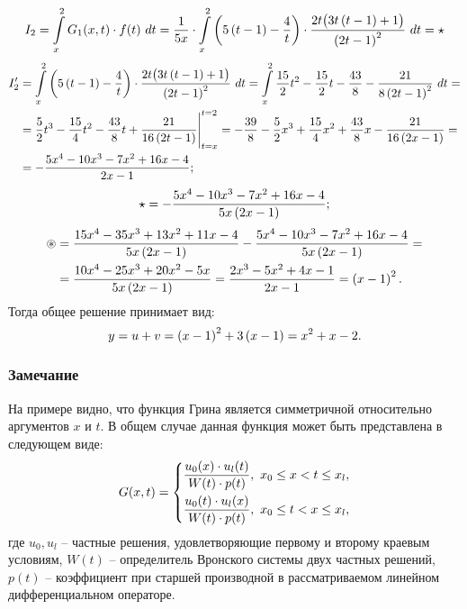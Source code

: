 \begin{enumerate}
				\[ 
					I_2 = \int\limits_x^2 G_1(x, t) \cdot f(t) ~ dt = \frac{1}{5x} \cdot \int\limits_x^2 \left( 5 \left( t - 1 \right) - \frac{4}{t} \right) \cdot \frac{2t \bigl( 3t \left( t - 1 \right) + 1 \bigr)}{\left( 2t - 1 \right)^2} ~ dt = \star
				\]
				\[ \begin{split}
					I'_2 &= \int\limits_x^2 \left( 5 \left( t - 1 \right) - \frac{4}{t} \right) \cdot \frac{2t \bigl( 3t \left( t - 1 \right) + 1 \bigr)}{\left( 2t - 1 \right)^2} ~ dt = \int\limits_x^2 \frac{15}{2} t^2 - \frac{15}{2} t - \frac{43}{8} - \frac{21}{8 \left( 2t - 1 \right)^2} ~ dt = \\
					&= \frac{5}{2} t^3 - \frac{15}{4} t^2 - \frac{43}{8} t + \frac{21}{16\left( 2t - 1 \right)} \Biggl\vert \Biggr._{t = x}^{t = 2} = -\frac{39}{8} - \frac{5}{2} x^3 + \frac{15}{4} x^2 + \frac{43}{8} x - \frac{21}{16\left( 2x - 1 \right)} = \\
					&= -\frac{5x^4 - 10x^3 - 7x^2 + 16x - 4}{2x - 1};
				\end{split} \]
				\[ 
					\star = -\frac{5x^4 - 10x^3 - 7x^2 + 16x - 4}{5x \left( 2x - 1 \right)};
				\]
				\[ \begin{split}
					\circledast &= \frac{15x^4 - 35 x^3 + 13x^2 + 11x - 4}{5x \left( 2x - 1 \right)} - \frac{5x^4 - 10x^3 - 7x^2 + 16x - 4}{5x \left( 2x - 1 \right)} = \\
					&= \frac{10x^4 - 25 x^3 + 20x^2 - 5x}{5x \left( 2x - 1 \right)} = \frac{2x^3 - 5x^2 + 4x - 1}{2x - 1} = \left( x-1 \right)^2.
				\end{split} \]
				Тогда общее решение принимает вид:
				\[ y = u + v = \left( x-1 \right)^2 + 3 \left( x-1 \right) = x^2 + x - 2. \]

		\end{enumerate}

	\subsubsection*{Замечание}

		На примере видно, что функция Грина является симметричной относительно аргументов $x$ и $t$. В общем случае данная функция может быть представлена в следующем виде:
		\[ G(x, t) = \left\lbrace \begin{aligned} 
			& \frac{u_0(x) \cdot u_l(t)}{W(t) \cdot p(t)}, ~ x_0 \le x < t \le x_l, \\
			& \frac{u_0(t) \cdot u_l(x)}{W(t) \cdot p(t)}, ~ x_0 \le t < x \le x_l,
		 \end{aligned} \right. \]
		где $u_0, u_l$ -- частные решения, удовлетворяющие первому и второму краевым условиям, $W(t)$ -- определитель Вронского системы двух частных решений, $p(t)$ -- коэффициент при старшей производной в рассматриваемом линейном дифференциальном операторе. 

